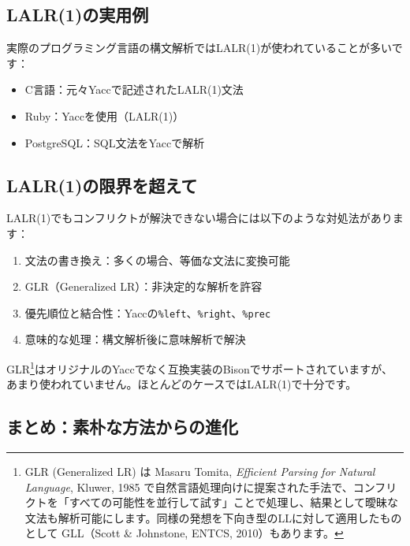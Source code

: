 \hypertarget{chapter5-lalr1ux306eux5b9fux7528ux4f8b}{%
\subsection{LALR(1)の実用例}\label{chapter5-lalr1ux306eux5b9fux7528ux4f8b}}

実際のプログラミング言語の構文解析ではLALR(1)が使われていることが多いです：

\begin{itemize}
\tightlist
\item
  C言語：元々Yaccで記述されたLALR(1)文法
\item
  Ruby：Yaccを使用（LALR(1)）
\item
  PostgreSQL：SQL文法をYaccで解析
\end{itemize}

\hypertarget{chapter5-lalr1ux306eux9650ux754cux3092ux8d85ux3048ux3066}{%
\subsection{LALR(1)の限界を超えて}\label{chapter5-lalr1ux306eux9650ux754cux3092ux8d85ux3048ux3066}}

LALR(1)でもコンフリクトが解決できない場合には以下のような対処法があります：

\begin{enumerate}
\def\labelenumi{\arabic{enumi}.}
\tightlist
\item
  文法の書き換え：多くの場合、等価な文法に変換可能
\item
  GLR（Generalized LR）：非決定的な解析を許容
\item
  優先順位と結合性：Yaccの\texttt{\%left}、\texttt{\%right}、\texttt{\%prec}
\item
  意味的な処理：構文解析後に意味解析で解決
\end{enumerate}

GLR\footnote{GLR (Generalized LR) は Masaru Tomita, \emph{Efficient
  Parsing for Natural Language}, Kluwer, 1985
  で自然言語処理向けに提案された手法で、コンフリクトを「すべての可能性を並行して試す」ことで処理し、結果として曖昧な文法も解析可能にします。同様の発想を下向き型のLLに対して適用したものとして
  GLL（Scott \& Johnstone, ENTCS, 2010）もあります。}はオリジナルのYaccでなく互換実装のBisonでサポートされていますが、あまり使われていません。ほとんどのケースではLALR(1)で十分です。

\hypertarget{chapter5-ux307eux3068ux3081ux7d20ux6734ux306aux65b9ux6cd5ux304bux3089ux306eux9032ux5316}{%
\subsection{まとめ：素朴な方法からの進化}\label{chapter5-ux307eux3068ux3081ux7d20ux6734ux306aux65b9ux6cd5ux304bux3089ux306eux9032ux5316}}


